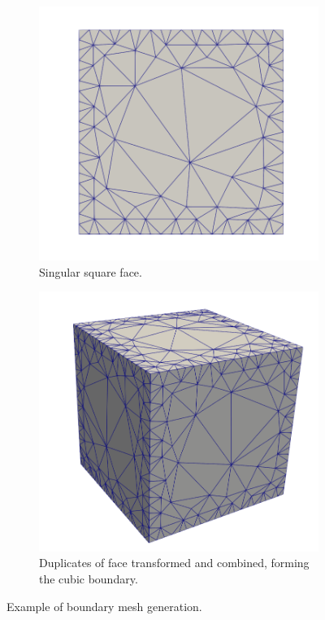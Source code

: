 \documentclass[12pt, letterpaper]{article}
\begin{document}
\begin{figure}[ht]
	\begin{subfigure}{0.48\textwidth}
		\includegraphics[width=\linewidth]{boundaryGen/square.png}
		\caption{Singular square face.}
	\end{subfigure}
	\hspace*{\fill}	
	\begin{subfigure}{0.48\textwidth}
		\includegraphics[width=\linewidth]{boundaryGen/cube.png}
		\caption{Duplicates of face transformed and combined, forming the cubic boundary.}
	\end{subfigure}	
	\caption{Example of boundary mesh generation.}
	\label{boundaryGenerationExample}
\end{figure}
\end{document}

